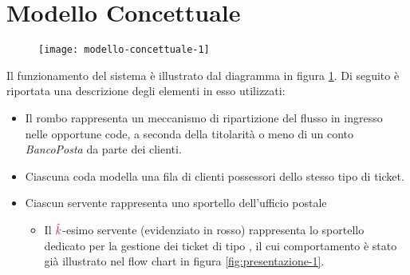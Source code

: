 \section{Modello Concettuale}\label{sec:modello-concettuale}
\begin{figure}[ht]
\centering
\texttt{[image: modello-concettuale-1]}
\label{fig:modello-concettuale-1}
\end{figure}

Il funzionamento del sistema è illustrato dal diagramma in figura \ref{fig:modello-concettuale-1}. Di seguito è riportata una descrizione degli elementi in esso utilizzati:
\begin{itemize}
\item Il rombo rappresenta un meccanismo di ripartizione del flusso in ingresso nelle opportune code, a seconda della titolarità o meno di un conto \textsl{BancoPosta} da parte dei clienti.
\item Ciascuna coda modella una fila di clienti possessori dello stesso tipo di ticket.
\item Ciascun servente rappresenta uno sportello dell'ufficio postale
\begin{itemize}
\item Il ${\color{red}\hat{k}}$-esimo servente (evidenziato in {\color{red} rosso}) rappresenta lo sportello dedicato per la gestione dei ticket di tipo \sr{}, il cui comportamento è stato già illustrato nel flow chart in figura \ref{fig:presentazione-1}.
\end{itemize}
\end{itemize}

